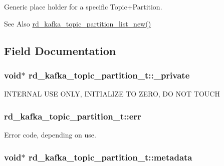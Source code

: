 Generic place holder for a specific Topic+\-Partition.

\begin{DoxySeeAlso}{See Also}
\hyperlink{rdkafka_8h_afb87d24333b6ad5a7415b06882f06b2a}{rd\-\_\-kafka\-\_\-topic\-\_\-partition\-\_\-list\-\_\-new()} 
\end{DoxySeeAlso}


\subsection{Field Documentation}
\hypertarget{structrd__kafka__topic__partition__t_ac41b2fea58ecc44fd8c99780ed9f6389}{
\subsubsection[{\-\_\-private}]{\setlength{\rightskip}{0pt plus 5cm}void$\ast$ rd\-\_\-kafka\-\_\-topic\-\_\-partition\-\_\-t\-::\-\_\-private}}\label{structrd__kafka__topic__partition__t_ac41b2fea58ecc44fd8c99780ed9f6389}
I\-N\-T\-E\-R\-N\-A\-L U\-S\-E O\-N\-L\-Y, I\-N\-I\-T\-I\-A\-L\-I\-Z\-E T\-O Z\-E\-R\-O, D\-O N\-O\-T T\-O\-U\-C\-H \hypertarget{structrd__kafka__topic__partition__t_ab9370931853903657d7cabc9643d336e}{
\subsubsection[{err}]{ rd\-\_\-kafka\-\_\-topic\-\_\-partition\-\_\-t\-::err}}\label{structrd__kafka__topic__partition__t_ab9370931853903657d7cabc9643d336e}
Error code, depending on use. \hypertarget{structrd__kafka__topic__partition__t_aa2a3d40daa1b0158186f3584886da5dc}{
\subsubsection[{metadata}]{\setlength{\rightskip}{0pt plus 5cm}void$\ast$ rd\-\_\-kafka\-\_\-topic\-\_\-partition\-\_\-t\-::metadata}}\label{structrd__kafka__topic__partition__t_aa2a3d40daa1b0158186f3584886da5dc}
